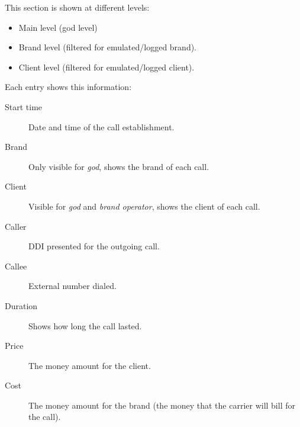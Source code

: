 \documentclass[letterpaper,10pt,english]{sphinxmanual}
\begin{document}
This section is shown at different levels:
\begin{itemize}
\item {} 
Main level (god level)

\item {} 
Brand level (filtered for emulated/logged brand).

\item {} 
Client level (filtered for emulated/logged client).

\end{itemize}

Each entry shows this information:
\begin{description}
\item[{Start time}] \leavevmode{}\label{administration_portal/client/retail/calls/external_calls:term-start-time}
Date and time of the call establishment.

\item[{Brand}] \leavevmode{}\label{administration_portal/client/retail/calls/external_calls:term-brand}
Only visible for \emph{god}, shows the brand of each call.

\item[{Client}] \leavevmode{}\label{administration_portal/client/retail/calls/external_calls:term-client}
Visible for \emph{god} and \emph{brand operator}, shows the client of each call.

\item[{Caller}] \leavevmode{}\label{administration_portal/client/retail/calls/external_calls:term-caller}
DDI presented for the outgoing call.

\item[{Callee}] \leavevmode{}\label{administration_portal/client/retail/calls/external_calls:term-callee}
External number dialed.

\item[{Duration}] \leavevmode{}\label{administration_portal/client/retail/calls/external_calls:term-duration}
Shows how long the call lasted.

\item[{Price}] \leavevmode{}\label{administration_portal/client/retail/calls/external_calls:term-price}
The money amount for the client.

\item[{Cost}] \leavevmode{}\label{administration_portal/client/retail/calls/external_calls:term-cost}
The money amount for the brand (the money that the carrier will bill for the call).


\end{description}
\end{document}
